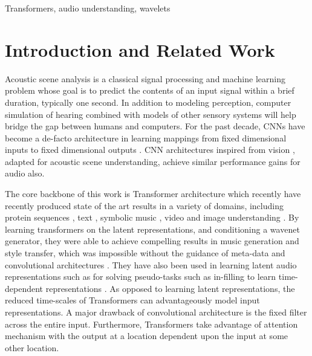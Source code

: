 \documentclass{article}
\begin{document}
\begin{sloppy}
\begin{keywords}
Transformers, audio understanding, wavelets
\end{keywords}

\section{Introduction and Related Work}
\label{sec:intro}

Acoustic scene analysis is a classical signal processing and machine learning problem whose goal is to predict the contents of an input signal within a brief duration, typically one second. In addition to modeling perception, computer simulation of hearing combined with models of other sensory systems will help bridge the gap between humans and computers. For the past decade, CNNs have become a de-facto architecture in learning mappings from fixed dimensional inputs to fixed dimensional outputs \cite{he2016deep,gemmeke2017audio}. CNN architectures inspired from vision \cite{he2016deep}, adapted for acoustic scene understanding, achieve similar performance gains for audio also. 

The core backbone of this work is Transformer architecture which recently have recently produced state of the art results in a variety of domains, including protein sequences \cite{madani2020progen}, text \cite{brown2020language,devlin2018bert},  symbolic music \cite{huang2018music}, video\cite{sun2019videobert,girdhar2019video} and image understanding \cite{dosovitskiy2020image,parmar2018image}. By learning transformers on the latent representations, and conditioning a wavenet generator, they were able to achieve compelling results in music generation \cite{dhariwal2020jukebox} and style transfer, which was impossible without the guidance of meta-data and convolutional architectures \cite{verma2018neural}. They have also been used in learning latent audio representations such as \cite{verma2019neuralogram,oord2017neural} for solving pseudo-tasks such as in-filling to learn time-dependent representations \cite{verma2020framework,devlin2018bert}. As opposed to learning latent representations, the reduced time-scales of Transformers can advantageously model input representations. A major drawback of convolutional architecture is the fixed filter across the entire input. Furthermore, Transformers take advantage of attention mechanism with the output at a location dependent upon the input at some other location. 


\end{sloppy}
\end{document}
